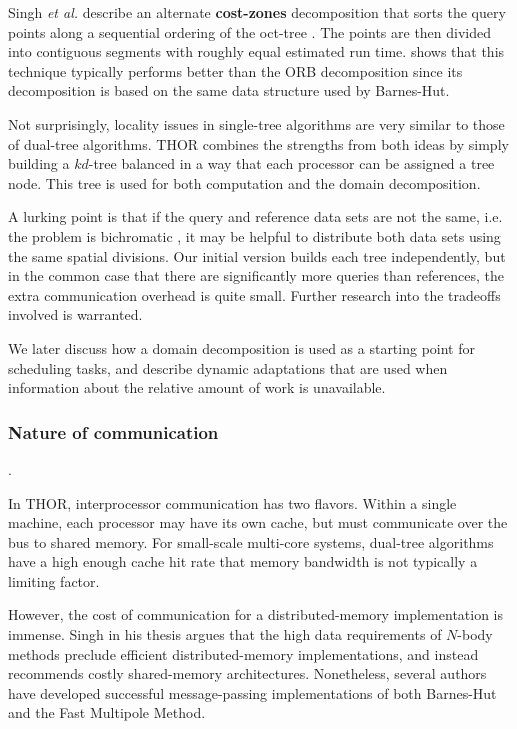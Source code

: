 \documentclass[twoside,leqno,twocolumn]{article}
\newcommand{\mysubsub}[1]{\subsubsection{#1}. }
\newcommand{\defterm}[1]{{\bf #1}}
\begin{document}
Singh {\it et al.} describe an alternate \defterm{cost-zones} decomposition that sorts the query points along a sequential ordering of the oct-tree \cite{singh95load}.
The points are then divided into contiguous segments with roughly equal estimated run time.
\cite{singh95load} shows that this technique typically performs better than the ORB decomposition since its decomposition is based on the same data structure used by Barnes-Hut.

Not surprisingly, locality issues in single-tree algorithms are very similar to those of dual-tree algorithms.
THOR combines the strengths from both ideas by simply building a $kd$-tree balanced in a way that each processor can be assigned a tree node.
This tree is used for both computation and the domain decomposition.

A lurking point is that if the query and reference data sets are not the same, i.e. the problem is bichromatic , it may be helpful to distribute both data sets using the same spatial divisions.
Our initial version builds each tree independently, but in the common case that there are significantly more queries than references, the extra communication overhead is quite small.
Further research into the tradeoffs involved is warranted.

We later discuss how a domain decomposition is used as a starting point for scheduling tasks, and describe dynamic adaptations that are used when information about the relative amount of work is unavailable.

\mysubsub{Nature of communication}

In THOR, interprocessor communication has two flavors.
Within a single machine, each processor may have its own cache, but must communicate over the bus to shared memory.
For small-scale multi-core systems, dual-tree algorithms have a high enough cache hit rate that memory bandwidth is not typically a limiting factor.

However, the cost of communication for a distributed-memory implementation is immense.
Singh in his thesis \cite{singh_thesis} argues that the high data requirements of $N$-body methods preclude efficient distributed-memory implementations, and instead recommends costly shared-memory architectures.
Nonetheless, several authors \cite{salmon_thesis, liu94experiences, salmon97parallel} have developed successful message-passing implementations of both Barnes-Hut and the Fast Multipole Method.
\end{document}
